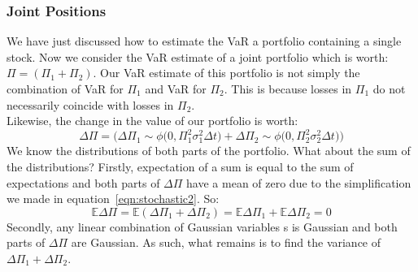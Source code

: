 \documentclass[../analytical_approach.tex]{subfiles}
\begin{document}
\subsubsection{Joint Positions}
\label{sec:jointpositions}
\iffalse
    \begin{figure}[H]
        \centering
        \caption{Joint Portfolio}
        \label{fig:jointpi}
        \begin{tikzpicture}
            \draw[very thick,purple] (0,0) circle [radius=4] ;
            \draw[dashed,orange] (315:4) -- (0,0) -- (225:4);
            \draw[thick,cyan] (90:4) -- (0,0) -- (270:4);
            \node at (135:2.5) {$\Pi_1$};
            \node at (45:2.5) {$\Pi_2$};
            \node at (245:3) {$\Delta\Pi_1$};
            \node at (295:3) {$\Delta\Pi_2$};
        \end{tikzpicture}
    \end{figure}
\fi
We have just discussed how to estimate the VaR a portfolio containing a single stock.
Now we consider the VaR estimate of a joint portfolio which is worth:  $\Pi = (\Pi_1+\Pi_2)$.
Our VaR estimate of this portfolio is not simply the combination of VaR for $\Pi_1$ and VaR for $\Pi_2$.
This is because losses in $\Pi_1$ do not necessarily coincide with losses in $\Pi_2$.\\
Likewise, the change in the value of our portfolio is worth:
\begin{equation}
    \label{eqn:deltajointpi}
    \Delta\Pi=\bigg(\Delta\Pi_1\sim\phi\big(0,\Pi^2_1\sigma^2_1\Delta t\big) + \Delta\Pi_2\sim\phi\big(0,\Pi^2_2\sigma^2_2\Delta t\big)\bigg)
\end{equation}
We know the distributions of both parts of the portfolio.
What about the sum of the distributions?
Firstly, expectation of a sum is equal to the sum of expectations and both parts of $\Delta\Pi$ have a mean of zero due to the simplification we made in equation~\ref{eqn:stochastic2}.
So:
\begin{equation}
    \label{eqn:sumexpectations}
    \mathbb{E}\Delta\Pi=\mathbb{E}(\Delta\Pi_1 + \Delta\Pi_2) = \mathbb{E}\Delta\Pi_1 + \mathbb{E}\Delta\Pi_2 = 0
\end{equation}
Secondly, any linear combination of Gaussian variables s is Gaussian and both parts of $\Delta\Pi$ are Gaussian.
As such, what remains is to find the variance of $\Delta\Pi_1 + \Delta\Pi_2$.
\end{document}
